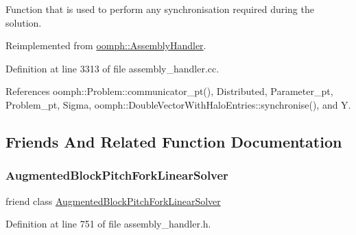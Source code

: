 Function that is used to perform any synchronisation required during the solution. 



Reimplemented from \hyperlink{classoomph_1_1AssemblyHandler_a0ccef21253d997dd1a78ed26c2b99fce}{oomph\+::\+Assembly\+Handler}.



Definition at line 3313 of file assembly\+\_\+handler.\+cc.



References oomph\+::\+Problem\+::communicator\+\_\+pt(), Distributed, Parameter\+\_\+pt, Problem\+\_\+pt, Sigma, oomph\+::\+Double\+Vector\+With\+Halo\+Entries\+::synchronise(), and Y.



\subsection{Friends And Related Function Documentation}
\mbox{\label{classoomph_1_1PitchForkHandler_a223dd55e02e905ce0ce98e98f50b7e57}} 
\subsubsection{\texorpdfstring{Augmented\+Block\+Pitch\+Fork\+Linear\+Solver}{AugmentedBlockPitchForkLinearSolver}}
{\footnotesize\ttfamily friend class \hyperlink{classoomph_1_1AugmentedBlockPitchForkLinearSolver}{Augmented\+Block\+Pitch\+Fork\+Linear\+Solver}\hspace{0.3cm}{\ttfamily [friend]}}



Definition at line 751 of file assembly\+\_\+handler.\+h.

\mbox{\label{classoomph_1_1PitchForkHandler_aba62ac8cc057be07657972adc4a78b45}} 
